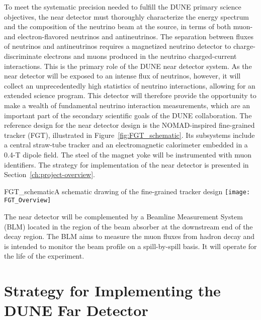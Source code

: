 To meet the systematic precision needed to fulfill the DUNE primary science objectives, the near detector must thoroughly 
characterize the energy spectrum and the composition of the neutrino beam at the source, in terms of
both muon- and electron-flavored neutrinos and antineutrinos. 
The separation between fluxes of neutrinos and antineutrinos requires a magnetized neutrino detector to 
charge-discriminate electrons and muons produced in the neutrino charged-current interactions.
%
This is the primary role of the DUNE near detector system. As the near detector will be exposed to an intense flux of neutrinos, however, it will %
collect an unprecedentedly high statistics of neutrino 
interactions, allowing  for an extended science program. 
This detector will therefore provide the opportunity to make a wealth of fundamental neutrino interaction 
measurements, which are an important part of the secondary scientific goals of the DUNE collaboration. 
%
The reference design for the near detector design is the NOMAD-inspired fine-grained tracker (FGT), illustrated in Figure~\ref{fig:FGT_schematic}. Its subsystems include a central 
straw-tube tracker and an electromagnetic calorimeter embedded in a 0.4-T dipole field. The steel of the
magnet yoke will be instrumented with muon identifiers. The strategy for implementation of
the near detector is presented in Section~\ref{ch:project-overview}.

\begin{cdrfigure}{FGT_schematic}{A schematic drawing of the fine-grained tracker design}
\texttt{[image: FGT\_Overview]}
\end{cdrfigure}


The near detector will be complemented by a Beamline Measurement System (BLM) located in the region of the beam absorber at the downstream end of the decay region. The BLM aims to measure the muon fluxes from hadron decay and
 is intended to monitor the beam profile on a spill-by-spill basis. It will operate for the life of the experiment.

\section{Strategy for Implementing the DUNE Far Detector}
\label{v1ch3:fd-impl-strategy}



